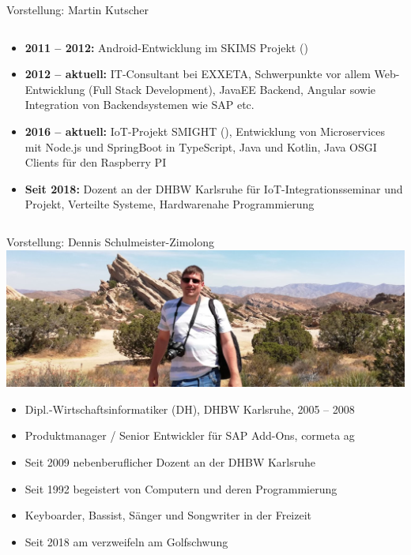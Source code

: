 \begin{frame}{Vorstellung: Martin Kutscher}
\begin{columns}
\begin{column}{.8\textwidth}
\begin{itemize}
                \item \textbf{2011 -- 2012:} Android-Entwicklung im SKIMS Projekt
                ()

                \item \textbf{2012 -- aktuell:} IT-Consultant bei EXXETA, Schwerpunkte vor allem
                Web-Entwicklung (Full Stack Development), JavaEE Backend, Angular sowie Integration
                von Backendsystemen wie SAP etc.

                \item \textbf{2016 -- aktuell:} IoT-Projekt SMIGHT (),
                Entwicklung von Microservices mit Node.js und SpringBoot in TypeScript, Java und
                Kotlin, Java OSGI Clients für den Raspberry PI

                \item \textbf{Seit 2018:} Dozent an der DHBW Karlsruhe für
                IoT-Integrationsseminar und Projekt, Verteilte Systeme, Hardwarenahe Programmierung
            \end{itemize}
        \end{column}
    \end{columns}
\end{frame}

\begin{frame}{Vorstellung: Dennis Schulmeister-Zimolong}
    \includegraphics[width=\textwidth]{1-grundlagen/img/dozent_schulmeister}

    \begin{itemize}
        \item Dipl.-Wirtschaftsinformatiker (DH), DHBW Karlsruhe, 2005 – 2008
        \item Produktmanager / Senior Entwickler für SAP Add-Ons, cormeta ag
        \item Seit 2009 nebenberuflicher Dozent an der DHBW Karlsruhe
        \item Seit 1992 begeistert von Computern und deren Programmierung
        \item Keyboarder, Bassist, Sänger und Songwriter in der Freizeit
        \item Seit 2018 am verzweifeln am Golfschwung \smiley{}
    \end{itemize}
\end{frame}

